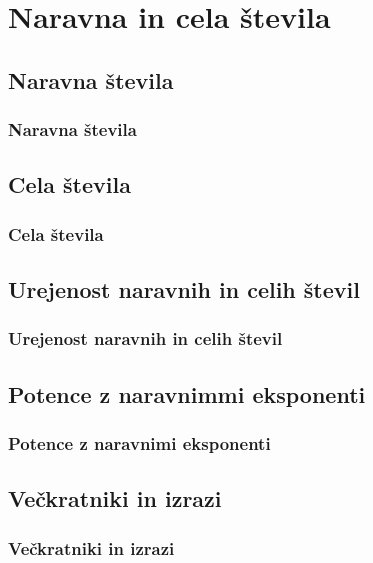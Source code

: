 \section{Naravna in cela števila}

\begin{frame}
    \sectionpage
\end{frame}

\begin{frame}
\end{frame}

    \subsection{Naravna števila}

        \begin{frame}
            \frametitle{Naravna števila}
        \end{frame}

    \subsection{Cela števila}

        \begin{frame}
            \frametitle{Cela števila}
        \end{frame}

    \subsection{Urejenost naravnih in celih števil}

        \begin{frame}
            \frametitle{Urejenost naravnih in celih števil}
        \end{frame}

    \subsection{Potence z naravnimmi eksponenti}

        \begin{frame}
            \frametitle{Potence z naravnimi eksponenti}
        \end{frame}

    \subsection{Večkratniki in izrazi}

        \begin{frame}
            \frametitle{Večkratniki in izrazi}
        \end{frame}
